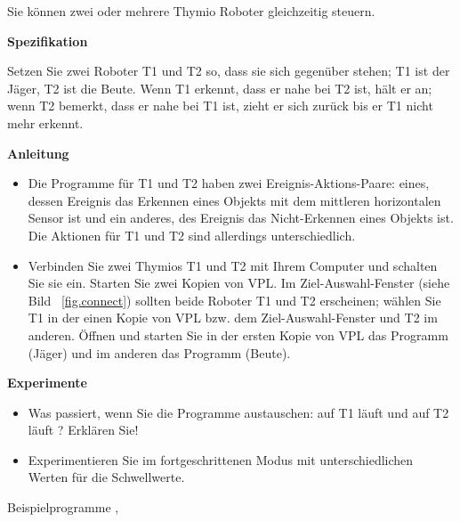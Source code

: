 \label{ch.two}

Sie können zwei oder mehrere Thymio Roboter gleichzeitig steuern.

\textbf{Spezifikation}

Setzen Sie zwei Roboter T1 und T2 so, dass sie sich gegenüber stehen; T1 ist der Jäger, T2 ist die Beute. Wenn T1 erkennt, dass er nahe bei T2 ist, hält er an; wenn T2 bemerkt, dass er nahe bei T1 ist, zieht er sich zurück bis er T1 nicht mehr erkennt.  

\textbf{Anleitung}

\begin{itemize}

\item Die Programme für T1 und T2 haben zwei Ereignis-Aktions-Paare: eines, dessen Ereignis das Erkennen eines Objekts mit dem mittleren horizontalen Sensor ist und ein anderes, des Ereignis das Nicht-Erkennen eines Objekts ist. Die Aktionen für T1 und T2 sind allerdings unterschiedlich. 

\item Verbinden Sie zwei Thymios T1 und T2 mit Ihrem Computer und schalten Sie sie ein. Starten Sie zwei Kopien von VPL. Im Ziel-Auswahl-Fenster (siehe Bild ~\ref{fig.connect}) sollten beide Roboter T1 und T2 erscheinen; wählen Sie T1 in der einen Kopie von VPL bzw. dem Ziel-Auswahl-Fenster und T2 im anderen. Öffnen und starten Sie in der ersten Kopie von VPL das Programm  (Jäger) und im anderen das Programm  (Beute).
 
\end{itemize}

\textbf{Experimente}

\begin{itemize}

\item Was passiert, wenn Sie die Programme austauschen: auf T1 läuft 
 und auf T2 läuft ? Erklären Sie!

\item Experimentieren Sie im fortgeschrittenen Modus mit unterschiedlichen Werten für die Schwellwerte. 

\end{itemize}


{\raggedleft \hfill Beispielprogramme , }

\bigskip

